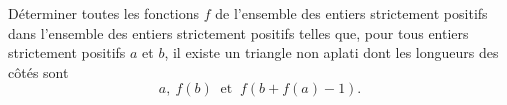 Déterminer toutes les fonctions $f$ de l'ensemble des entiers strictement positifs dans l'ensemble des
entiers strictement positifs telles que, pour tous entiers strictement positifs $a$ et $b$, il existe un
triangle non aplati dont les longueurs des côtés sont
\[
a, \ f(b) \ \text{ et } \ f(b + f(a) - 1).
\]
